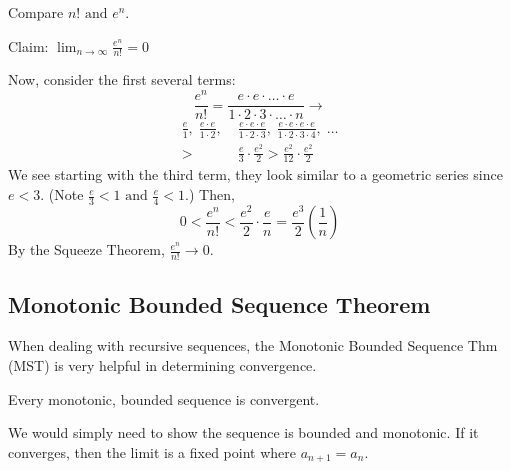 \documentclass[../main.tex]{subfiles}
\begin{document}
\begin{example}[]
    Compare \( {n!} \text{ and } {e^n} \).

    Claim: \( \lim_{n \to \infty} \frac{e^n}{n!} = 0 \)

    Now, consider the first several terms:
    \[ \frac{e^n}{n!} = \frac{e \cdot e \cdot \ldots \cdot e}{1 \cdot 2 \cdot 3 \cdot \ldots \cdot n} \rightarrow \]
    \begin{align*}
        \frac{e}{1}, \; \frac{e \cdot e}{1 \cdot 2}, \; & \frac{e \cdot e \cdot e}{1 \cdot 2 \cdot 3}, \; \frac{e \cdot e \cdot e \cdot e}{1 \cdot 2 \cdot 3 \cdot 4}, \; \dots \\
        > & \frac{e}{3}\cdot\frac{e^2}{2} > \frac{e^2}{12} \cdot \frac{e^2}{2}
    \end{align*}
    We see starting with the third term, they look similar to a geometric series since \( e < 3 \). (Note \( \frac{e}{3} < 1 \text{ and } \frac{e}{4}<1 \).)
    Then,
    \[ 0 < \frac{e^n}{n!} < \frac{e^2}{2}\cdot\frac{e}{n} = \frac{e^3}{2}\left(\frac{1}{n}\right) \]
    By the Squeeze Theorem, \( \frac{e^n}{n!} \to 0 \).
\end{example}

\subsection{Monotonic Bounded Sequence Theorem}

When dealing with recursive sequences, the Monotonic Bounded Sequence Thm (MST) is very helpful in determining convergence.

\begin{theorem}
    \label{mst}
    Every monotonic, bounded sequence is convergent.
\end{theorem}

We would simply need to show the sequence is bounded and monotonic. If it converges, then the limit is a fixed point where \( a_{n+1} = a_n \).

\end{document}
